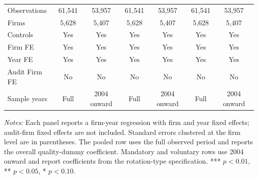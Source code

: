 \documentclass[10pt]{article}
\begin{document}
\begin{minipage}{19cm}
\begin{threeparttable}
\begin{tabular}{l cc cc cc}
Observations & 61,541 & 53,957 & 61,541 & 53,957 & 61,541 & 53,957 \\
Firms & 5,628 & 5,407 & 5,628 & 5,407 & 5,628 & 5,407 \\
\midrule
Controls & Yes & Yes & Yes & Yes & Yes & Yes \\
Firm FE & Yes & Yes & Yes & Yes & Yes & Yes \\
Year FE & Yes & Yes & Yes & Yes & Yes & Yes \\
Audit Firm FE & No & No & No & No & No & No \\
Sample years & Full & 2004 onward & Full & 2004 onward & Full & 2004 onward \\
\bottomrule
\end{tabular}
\begin{tablenotes}\fontsize{9}{11}\selectfont
\item \fontsize{9}{11}\selectfont \textit{Notes:} Each panel reports a firm-year regression with firm and year fixed effects; audit-firm fixed effects are not included. Standard errors clustered at the firm level are in parentheses. The pooled row uses the full observed period and reports the overall quality-dummy coefficient. Mandatory and voluntary rows use 2004 onward and report coefficients from the rotation-type specification. *** \(p<0.01\), ** \(p<0.05\), * \(p<0.10\).
\end{tablenotes}
\end{threeparttable}

\end{minipage}
\end{document}
